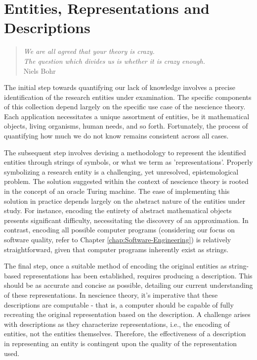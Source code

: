 %
%


\chapter{Entities, Representations and Descriptions}
\label{cha:Topics-and-Descriptions}

\begin{quote}
\begin{flushright}
\emph{We are all agreed that your theory is crazy. \\
The question which divides us is whether it is crazy enough.} \\
Niels Bohr
\end{flushright}
\end{quote}
\bigskip

The initial step towards quantifying our lack of knowledge involves a precise identification of the research entities under examination. The specific components of this collection depend largely on the specific use case of the nescience theory. Each application necessitates a unique assortment of entities, be it mathematical objects, living organisms, human needs, and so forth. Fortunately, the process of quantifying how much we do not know remains consistent across all cases.

The subsequent step involves devising a methodology to represent the identified entities through strings of symbols, or what we term as 'representations'. Properly symbolizing a research entity is a challenging, yet unresolved, epistemological problem. The solution suggested within the context of nescience theory is rooted in the concept of an oracle Turing machine. The ease of implementing this solution in practice depends largely on the abstract nature of the entities under study. For instance, encoding the entirety of abstract mathematical objects presents significant difficulty, necessitating the discovery of an approximation. In contrast, encoding all possible computer programs (considering our focus on software quality, refer to Chapter \ref{chap:Software-Engineering}) is relatively straightforward, given that computer programs inherently exist as strings.

The final step, once a suitable method of encoding the original entities as string-based representations has been established, requires producing a description. This should be as accurate and concise as possible, detailing our current understanding of these representations. In nescience theory, it's imperative that these descriptions are computable - that is, a computer should be capable of fully recreating the original representation based on the description. A challenge arises with descriptions as they characterize representations, i.e., the encoding of entities, not the entities themselves. Therefore, the effectiveness of a description in representing an entity is contingent upon the quality of the representation used.

